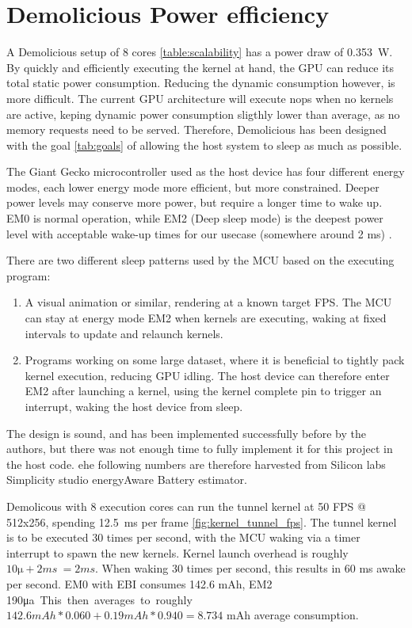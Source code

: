 \documentclass[../main/report.tex]{subfiles}
\begin{document}
\section{Demolicious Power efficiency}

A Demolicious setup of 8 cores \ref{table:scalability} has a power draw of \SI{0.353}{W}.
By quickly and efficiently executing the kernel at hand, the GPU can reduce its total static power consumption.
Reducing the dynamic consumption however, is more difficult.
The current GPU architecture will execute nops when no kernels are active, keping dynamic power consumption sligthly lower than average, as no memory requests need to be served.
Therefore, Demolicious has been designed with the goal \ref{tab:goals} of allowing the host system to sleep as much as possible.

The Giant Gecko microcontroller used as the host device has four different energy modes, each lower energy mode more efficient, but more constrained.
Deeper power levels may conserve more power, but require a longer time to wake up.
EM0 is normal operation, while EM2 (Deep sleep mode) is the deepest power level with acceptable wake-up times for our usecase (somewhere around 2 ms) \cite{efm-referencemanual}.

There are two different sleep patterns used by the MCU based on the executing program:
\begin{enumerate}
  \item
    A visual animation or similar, rendering at a known target FPS.
    The MCU can stay at energy mode EM2 when kernels are executing, waking at fixed intervals to update and relaunch kernels.
  \item
    Programs working on some large dataset, where it is beneficial to tightly pack kernel execution, reducing GPU idling.
    The host device can therefore enter EM2 after launching a kernel, using the kernel complete pin to trigger an interrupt, waking the host device from sleep.
\end{enumerate}

The design is sound, and has been implemented successfully before by the authors,
but there was not enough time to fully implement it for this project in the host code.
ehe following numbers are therefore harvested from Silicon labs Simplicity studio energyAware Battery estimator.

Demolicous with 8 execution cores can run the tunnel kernel at 50 FPS @ 512x256, spending \SI{12.5}{ms} per frame \ref{fig:kernel_tunnel_fps}.
The tunnel kernel is to be executed 30 times per second, with the MCU waking via a timer interrupt to spawn the new kernels.
Kernel launch overhead is roughly $ 10\si\micro + 2 ms ~= 2 ms.$ When waking 30 times per second, this results in 60 ms awake per second.
EM0 with EBI consumes 142.6 mAh, EM2 190\si\micro a. This then averages to roughly $ 142.6 mAh * 0.060 + 0.19 mAh * 0.940 = 8.734$ mAh average consumption.
\end{document}
